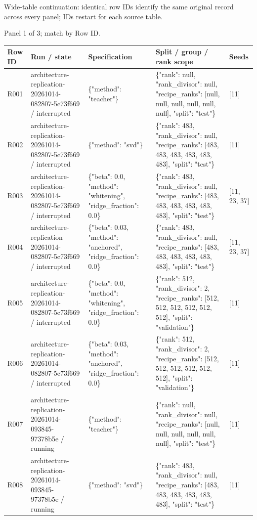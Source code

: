 \documentclass[10pt]{article}
\begin{document}
Wide-table continuation: identical row IDs identify the same original record across every panel; IDs restart for each source table.
\par\noindent Panel 1 of 3; match by Row ID.
{\scriptsize\setlength{\tabcolsep}{2pt}
\begin{longtable}{p{}p{}p{}p{}p{}}
Row ID & Run / state & Specification & Split / group / rank scope & Seeds \\
\hline\endhead
R001 & architecture-replication-20261014-082807-5c73f669 / interrupted & \{"method": "teacher"\} & \{"rank": null, "rank\_divisor": null, "recipe\_ranks": [null, null, null, null, null, null], "split": "test"\} & [11] \\
R002 & architecture-replication-20261014-082807-5c73f669 / interrupted & \{"method": "svd"\} & \{"rank": 483, "rank\_divisor": null, "recipe\_ranks": [483, 483, 483, 483, 483, 483], "split": "test"\} & [11] \\
R003 & architecture-replication-20261014-082807-5c73f669 / interrupted & \{"beta": 0.0, "method": "whitening", "ridge\_fraction": 0.0\} & \{"rank": 483, "rank\_divisor": null, "recipe\_ranks": [483, 483, 483, 483, 483, 483], "split": "test"\} & [11, 23, 37] \\
R004 & architecture-replication-20261014-082807-5c73f669 / interrupted & \{"beta": 0.03, "method": "anchored", "ridge\_fraction": 0.0\} & \{"rank": 483, "rank\_divisor": null, "recipe\_ranks": [483, 483, 483, 483, 483, 483], "split": "test"\} & [11, 23, 37] \\
R005 & architecture-replication-20261014-082807-5c73f669 / interrupted & \{"beta": 0.0, "method": "whitening", "ridge\_fraction": 0.0\} & \{"rank": 512, "rank\_divisor": 2, "recipe\_ranks": [512, 512, 512, 512, 512, 512], "split": "validation"\} & [11] \\
R006 & architecture-replication-20261014-082807-5c73f669 / interrupted & \{"beta": 0.03, "method": "anchored", "ridge\_fraction": 0.0\} & \{"rank": 512, "rank\_divisor": 2, "recipe\_ranks": [512, 512, 512, 512, 512, 512], "split": "validation"\} & [11] \\
R007 & architecture-replication-20261014-093845-97378b5e / running & \{"method": "teacher"\} & \{"rank": null, "rank\_divisor": null, "recipe\_ranks": [null, null, null, null, null, null], "split": "test"\} & [11] \\
R008 & architecture-replication-20261014-093845-97378b5e / running & \{"method": "svd"\} & \{"rank": 483, "rank\_divisor": null, "recipe\_ranks": [483, 483, 483, 483, 483, 483], "split": "test"\} & [11] \\

\end{longtable}}
\end{document}
